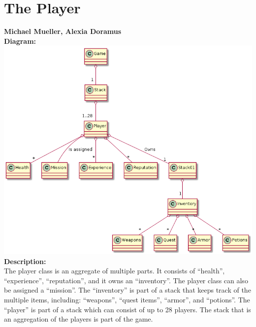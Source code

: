 \documentclass[11pt]{report}
\begin{document}
\chapter{The Player}
\textbf{Michael Mueller, Alexia Doramus}\\

\noindent\textbf{Diagram:}\\
\includegraphics[width=\textwidth]{playerclass.png}\\

\noindent\textbf{Description:}\\
The player class is an aggregate of multiple parts. It consists of ``health'', ``experience'', ``reputation'', and it owns an ``inventory''. The player class can also be assigned a ``mission''. The ``inventory'' is part of a stack that keeps track of the multiple items, including: ``weapons'', ``quest items'', ``armor'', and ``potions''. The ``player'' is part of a stack which can consist of up to 28 players. The stack that is an aggregation of the players is part of the game.
\end{document}
